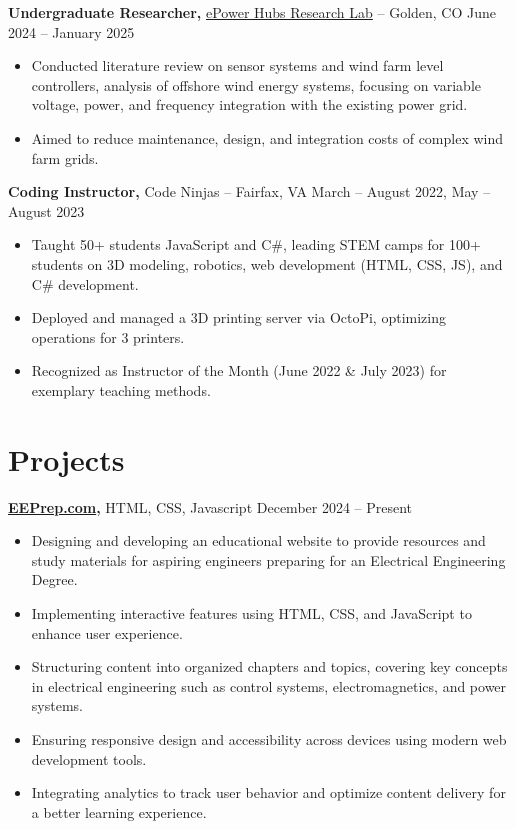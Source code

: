 \documentclass[11pt]{article}       %
\begin{document}
\textbf{Undergraduate Researcher, }{\href{https://www.epowerhubs.com/home}{ePower Hubs Research Lab}} -- Golden, CO \hfill June 2024 -- January 2025 \\
\vspace{-6.5pt}
\begin{itemize}
  \item Conducted literature review on sensor systems and wind farm level controllers, analysis of offshore wind energy systems, focusing on variable voltage, power, and frequency integration with the existing power grid.
  \item Aimed to reduce maintenance, design, and integration costs of complex wind farm grids.
\end{itemize}


\textbf{Coding Instructor, }{Code Ninjas} -- Fairfax, VA \hfill March -- August 2022, May -- August 2023 \\
\vspace{-6.5pt}
\begin{itemize}
  \item Taught 50+ students JavaScript and C\#, leading STEM camps for 100+ students on 3D modeling, robotics, web development (HTML, CSS, JS), and C\# development.
  \item Deployed and managed a 3D printing server via OctoPi, optimizing operations for 3 printers.
  \item Recognized as Instructor of the Month (June 2022 \& July 2023) for exemplary teaching methods.
\end{itemize}

\vspace{-19pt}
\section*{Projects}

\textbf{\href{https://eeprep.com}{EEPrep.com}, }{HTML, CSS, Javascript } \hfill {December 2024 -- Present} \\
\vspace{-6.5pt}
\begin{itemize}
    \item Designing and developing an educational website to provide resources and study materials for aspiring engineers preparing for an Electrical Engineering Degree.
    \item Implementing interactive features using HTML, CSS, and JavaScript to enhance user experience.
    \item Structuring content into organized chapters and topics, covering key concepts in electrical engineering such as control systems, electromagnetics, and power systems.
    \item Ensuring responsive design and accessibility across devices using modern web development tools.
    \item Integrating analytics to track user behavior and optimize content delivery for a better learning experience.
\end{itemize}
\end{document}
